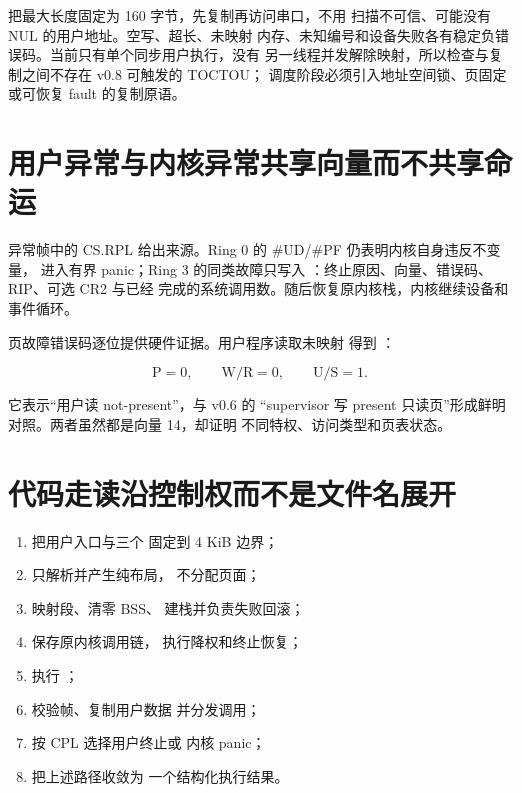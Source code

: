  把最大长度固定为 160 字节，先复制再访问串口，不用
 扫描不可信、可能没有 NUL 的用户地址。空写、超长、未映射
内存、未知编号和设备失败各有稳定负错误码。当前只有单个同步用户执行，没有
另一线程并发解除映射，所以检查与复制之间不存在 v0.8 可触发的 TOCTOU；
调度阶段必须引入地址空间锁、页固定或可恢复 fault 的复制原语。

\section{用户异常与内核异常共享向量而不共享命运}

异常帧中的 CS.RPL 给出来源。Ring 0 的 \#UD/\#PF 仍表明内核自身违反不变量，
进入有界 panic；Ring 3 的同类故障只写入
：终止原因、向量、错误码、RIP、可选 CR2 与已经
完成的系统调用数。随后恢复原内核栈，内核继续设备和事件循环。

页故障错误码逐位提供硬件证据。用户程序读取未映射
 得到 ：

\[
  \mathrm{P}=0,\qquad \mathrm{W/R}=0,\qquad \mathrm{U/S}=1.
\]

它表示“用户读 not-present”，与 v0.6 的 
“supervisor 写 present 只读页”形成鲜明对照。两者虽然都是向量 14，却证明
不同特权、访问类型和页表状态。

\section{代码走读沿控制权而不是文件名展开}

\begin{enumerate}
  \item {} 把用户入口与三个
         固定到 4 KiB 边界；
  \item {} 只解析并产生纯布局，
        不分配页面；
  \item {} 映射段、清零 BSS、
        建栈并负责失败回滚；
  \item {} 保存原内核调用链，
        执行降权和终止恢复；
  \item {} 执行
        ；
  \item {} 校验帧、复制用户数据
        并分发调用；
  \item {} 按 CPL 选择用户终止或
        内核 panic；
  \item {} 把上述路径收敛为
        一个结构化执行结果。
\end{enumerate}

